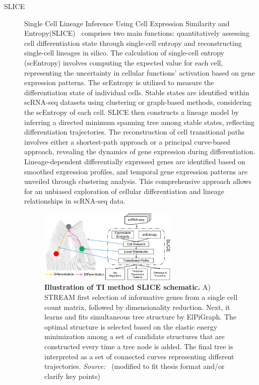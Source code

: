 \begin{description}
    \item[SLICE]
    Single Cell Lineage Inference Using Cell Expression Similarity and Entropy(SLICE)~\citep{guo2017slice} comprises two main functions: quantitatively assessing cell differentiation state through single-cell entropy and reconstructing single-cell lineages in silico. The calculation of single-cell entropy (scEntropy) involves computing the expected value for each cell, representing the uncertainty in cellular functions' activation based on gene expression patterns. The scEntropy is utilized to measure the differentiation state of individual cells. Stable states are identified within scRNA-seq datasets using clustering or graph-based methods, considering the scEntropy of each cell. SLICE then constructs a lineage model by inferring a directed minimum spanning tree among stable states, reflecting differentiation trajectories. The reconstruction of cell transitional paths involves either a shortest-path approach or a principal curve-based approach, revealing the dynamics of gene expression during differentiation. Lineage-dependent differentially expressed genes are identified based on smoothed expression profiles, and temporal gene expression patterns are unveiled through clustering analysis. This comprehensive approach allows for an unbiased exploration of cellular differentiation and lineage relationships in scRNA-seq data.
    \begin{figure}[ht!]
    	\centering
    	\includegraphics[width=0.65\textwidth]{TI_Alg_SLICE/fig}
    	\vspace{0.1cm}
    	\caption[Illustration of TI method SLICE schematic.]{\textbf{Illustration of TI method SLICE schematic.}
    	A)  STREAM first selection of informative genes from a single cell count matrix, followed by dimensionality reduction. Next, it learns and fits simultaneous tree structure by ElPiGraph. The optimal structure is selected based on the elastic energy minimization among a set of candidate structures that are constructed every time a tree node is added. The final tree is interpreted as a set of connected curves representing different trajectories. \emph{Source:~\cite{guo2017slice}} (modified to fit thesis format and/or clarify key points)
    	}
    	\label{fig:TI_Alg_SLICE}
    \end{figure}


\end{description}
